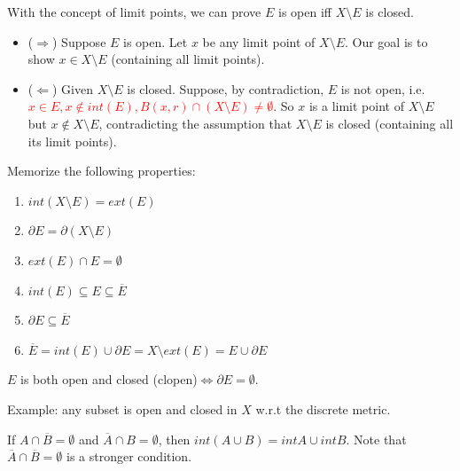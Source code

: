 \documentclass[12pt]{article}
\begin{document}
\begin{pfbox}
With the concept of limit points, we can prove $E$ is open iff $X\setminus E$ is closed.
\begin{itemize}
\item ($\Rightarrow$) Suppose $E$ is open. Let $x$ be any limit point of $X\setminus E$. Our goal is to show $x \in X\setminus E$ (containing all limit points).
\item ($\Leftarrow$) Given $X\setminus E$ is closed. Suppose, by contradiction, $E$ is not open, i.e. \textcolor{red}{$x\in E, x\notin int(E), B(x,r)\cap(X\setminus E)\neq \emptyset$}.
So $x$ is a limit point of $X\setminus E$ but $x\notin X\setminus E$, contradicting the assumption that $X\setminus E$ is closed (containing all its limit points).
\end{itemize}
\end{pfbox}



\begin{dbox}
\begin{property}
Memorize the following properties:
    \begin{enumerate} 
    \item $int(X\setminus E)=ext(E)$
    \item $\partial E = \partial (X\setminus E)$
    \item $ext(E)\cap  E = \emptyset$
    \item $int(E) \subseteq E \subseteq \overline{E}$
    \item $\partial E \subseteq \overline{E}$
    \item $\overline{E} = int(E) \cup \partial E = X\setminus ext(E) = E\cup\partial E$
\end{enumerate}
\end{property}
\end{dbox}



\begin{theorem}
    $E$ is both open and closed (clopen)$\Leftrightarrow \partial E = \emptyset$.
\end{theorem}

Example: any subset is open and closed in $X$ w.r.t the discrete metric.

\begin{theorem}
If $A \cap \overline{B} = \emptyset$ and $\overline{A}\cap B= \emptyset$, 
then $int(A \cup B) = int A \cup int B$. 
Note that $\overline{A}\cap \overline{B}=\emptyset$  is a stronger condition.
\end{theorem}
\end{document}

